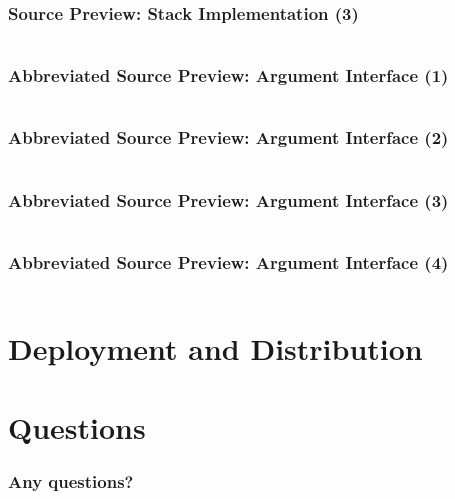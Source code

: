 \documentclass{beamer}
\numberwithin{figure}{section}
\newcounter{firstsrcline}
\newcounter{lastsrcline}
\newcommand\srclinelimit{29}
\newcommand\resetsrclines{%
    \setcounter{firstsrcline}{1}
    \setcounter{lastsrcline}{\thefirstsrcline+\srclinelimit}
}
\newcommand\continuesource[1]{%
    \inputminted[firstline=\thefirstsrcline, lastline=\thelastsrcline,
        firstnumber=\thefirstsrcline]{c}{listings/#1}
    \setcounter{firstsrcline}{\thelastsrcline+1}
    \setcounter{lastsrcline}{\thefirstsrcline+\srclinelimit}
}
\begin{document}
\begin{frame}
    \frametitle{Source Preview: Stack Implementation (3)}
    \continuesource{stack.c}
\end{frame}
\begin{frame}
    \frametitle{Abbreviated Source Preview: Argument Interface (1)}
    \resetsrclines
    \continuesource{args.h}
\end{frame}
\begin{frame}
    \frametitle{Abbreviated Source Preview: Argument Interface (2)}
    \continuesource{args.h}
\end{frame}
\begin{frame}
    \frametitle{Abbreviated Source Preview: Argument Interface (3)}
    \continuesource{args.h}
\end{frame}
\begin{frame}
    \frametitle{Abbreviated Source Preview: Argument Interface (4)}
    \continuesource{args.h}
\end{frame}
\section{Deployment and Distribution}
%
\section{Questions}
\begin{frame}
    \frametitle{Any questions?}
\end{frame}
\end{document}
